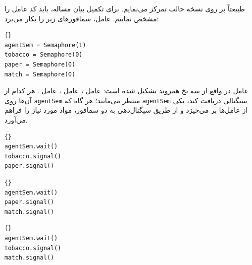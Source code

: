 \documentclass{book}
\begin{document}
    طبیعتاً بر روی نسخه جالب تمرکز می‌نمایم. برای تکمیل بیان مساله، باید کد عامل را مشخص نماییم. عامل، سمافورهای زیر را بکار می‌برد:

\begin{latin}
\begin{latin}
\begin{lstlisting}[title=\rl{سمافورهای عامل}]{}
agentSem = Semaphore(1)
tobacco = Semaphore(0)
paper = Semaphore(0)
match = Semaphore(0)
\end{lstlisting}
\end{latin}
\end{latin}

    عامل در واقع از سه نخ همروند تشکیل شده است:  عامل ،  عامل ،  عامل .
    هر کدام از آن‌ها روی {\tt agentSem} منتظر می‌مانند؛ هر گاه که {\tt agentSem} سیگنالی دریافت کند، یکی از عامل‌ها بر می‌خیزد و 
    از طریق سیگنال‌دهی به دو سمافور، مواد مورد نیاز را فراهم می‌آورد. 

\begin{latin}
\begin{latin}
\begin{lstlisting}[title=\rl{کد عامل \lr{A}}]{}
agentSem.wait()
tobacco.signal()
paper.signal()
\end{lstlisting}
\end{latin}


\begin{latin}
\begin{lstlisting}[title=\rl{کد عامل \lr{B}}]{}
agentSem.wait()
paper.signal()
match.signal()
\end{lstlisting}
\end{latin}

\begin{latin}
\begin{lstlisting}[title=\rl{کد عامل \lr{C}}]{}
agentSem.wait()
tobacco.signal()
match.signal()
\end{lstlisting}
\end{latin}
\end{latin}
\end{document}
